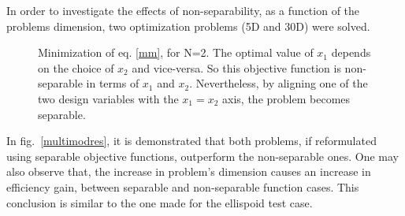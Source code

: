 In order to investigate the effects of non-separability, as a function of the problems dimension, two optimization problems (5D and 30D) were solved.  
\begin{figure}[h!]
\begin{minipage}[b]{1\linewidth}
 \centering
\end{minipage}
\caption{Minimization of eq. \ref{mm}, for N=2. The optimal value of $x_1$  depends on the choice of $x_2$ and vice-versa. So this objective function is non-separable in terms of $x_1$ and $x_2$. Nevertheless, by aligning one of the two design variables with the $x_1\!=\!x_2$ axis, the problem becomes separable.} 

\label{multimod}
\end{figure}

In fig.\ \ref{multimodres}, it is demonstrated that both problems, if reformulated using  separable objective functions, outperform the non-separable ones. One may also observe that, the increase in problem's dimension causes an increase in efficiency gain, between separable and non-separable function cases. This conclusion is similar to the one made for the ellispoid test case. 



